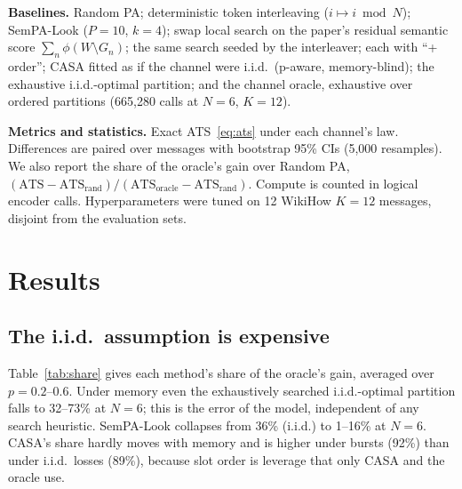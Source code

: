\documentclass[journal,onecolumn,11pt,draftclsnofoot]{IEEEtran}
\newcommand{\ATS}{\mathrm{ATS}}
\begin{document}
\textbf{Baselines.} Random PA; deterministic token interleaving ($i\mapsto i \bmod N$); SemPA-Look ($P=10$, $k=4$); swap local search on the paper's residual semantic score $\sum_n\phi(W\setminus G_n)$; the same search seeded by the interleaver; each with ``+ order''; CASA fitted as if the channel were i.i.d.\ (p-aware, memory-blind); the exhaustive i.i.d.-optimal partition; and the channel oracle, exhaustive over ordered partitions (665{,}280 calls at $N=6$, $K=12$).

\textbf{Metrics and statistics.} Exact ATS~\eqref{eq:ats} under each channel's law. Differences are paired over messages with bootstrap 95\% CIs (5{,}000 resamples). We also report the share of the oracle's gain over Random PA, $(\ATS-\ATS_{\text{rand}})/(\ATS_{\text{oracle}}-\ATS_{\text{rand}})$. Compute is counted in logical encoder calls. Hyperparameters were tuned on 12 WikiHow $K=12$ messages, disjoint from the evaluation sets.

\section{Results}
\label{sec:results}

\subsection{The i.i.d.\ assumption is expensive}

Table~\ref{tab:share} gives each method's share of the oracle's gain, averaged over $p=0.2$--$0.6$. Under memory even the exhaustively searched i.i.d.-optimal partition falls to 32--73\% at $N=6$; this is the error of the model, independent of any search heuristic. SemPA-Look collapses from 36\% (i.i.d.) to 1--16\% at $N=6$. CASA's share hardly moves with memory and is higher under bursts (92\%) than under i.i.d.\ losses (89\%), because slot order is leverage that only CASA and the oracle use.
\end{document}
